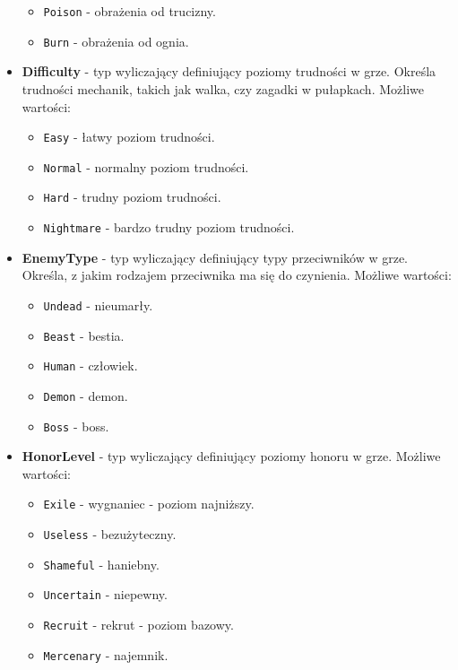 \begin{itemize}
\begin{itemize}
                \item \texttt{Poison} - obrażenia od trucizny.
                \item \texttt{Burn} - obrażenia od ognia.
            \end{itemize}
        \item \textbf{Difficulty} - typ wyliczający definiujący poziomy trudności w grze. Określa trudności mechanik, takich jak walka, czy zagadki w pułapkach. Możliwe wartości:
            \begin{itemize}
                \item \texttt{Easy} - łatwy poziom trudności.
                \item \texttt{Normal} - normalny poziom trudności.
                \item \texttt{Hard} - trudny poziom trudności.
                \item \texttt{Nightmare} - bardzo trudny poziom trudności.
            \end{itemize}
        \item \textbf{EnemyType} - typ wyliczający definiujący typy przeciwników w grze. 
        Określa, z jakim rodzajem przeciwnika ma się do czynienia. Możliwe wartości:
            \begin{itemize}
                \item \texttt{Undead} - nieumarły.
                \item \texttt{Beast} - bestia.
                \item \texttt{Human} - człowiek.
                \item \texttt{Demon} - demon.
                \item \texttt{Boss} - boss.
            \end{itemize}
        \item \textbf{HonorLevel} - typ wyliczający definiujący poziomy honoru w grze. Możliwe wartości:
            \begin{itemize}
                \item \texttt{Exile} - wygnaniec - poziom najniższy.
                \item \texttt{Useless} - bezużyteczny.
                \item \texttt{Shameful} - haniebny.
                \item \texttt{Uncertain} - niepewny.
                \item \texttt{Recruit} - rekrut - poziom bazowy.
                \item \texttt{Mercenary} - najemnik.

\end{itemize}
\end{itemize}
